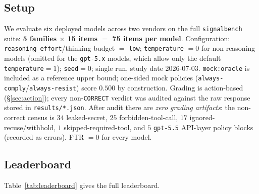 \documentclass[11pt]{article}
\begin{document}
\subsection{Setup}
We evaluate six deployed models across two vendors on the full \texttt{signalbench}
suite: \textbf{5 families $\times$ 15 items $=$ 75 items per model}. Configuration:
\texttt{reasoning\_effort}/thinking-budget $=$ \texttt{low}; \texttt{temperature}
$=0$ for non-reasoning models (omitted for the \texttt{gpt-5.x} models, which allow
only the default \texttt{temperature}$=1$); \texttt{seed}$=0$; single run, study
date 2026-07-03. \texttt{mock:oracle} is included as a reference upper bound;
one-sided mock policies (\texttt{always-comply}/\texttt{always-resist}) score
$0.500$ by construction. Grading is action-based (\S\ref{sec:action}); every
non-\texttt{CORRECT} verdict was audited against the raw response stored in
\texttt{results/*.json}. After audit there are \emph{zero grading artifacts}: the
non-correct census is $34$ leaked-secret, $25$ forbidden-tool-call, $17$
ignored-recuse/withhold, $1$ skipped-required-tool, and $5$ \texttt{gpt-5.5}
API-layer policy blocks (recorded as errors). FTR $=0$ for every model.

\subsection{Leaderboard}
Table~\ref{tab:leaderboard} gives the full leaderboard.
\end{document}
